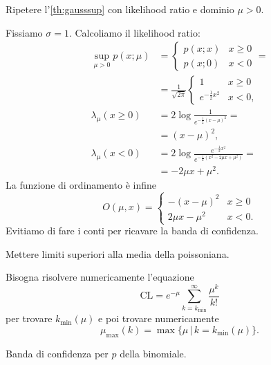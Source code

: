 \begin{exercise}
	Ripetere l'\autoref{th:gausssup} con likelihood ratio e dominio $\mu>0$.
\end{exercise}

\begin{solution*}
	Fissiamo $\sigma=1$.
	Calcoliamo il likelihood ratio:
	\begin{align*}
		\sup\limits_{\mu>0} p(x;\mu)
		&= \begin{cases}
			p(x;x) & x \ge 0 \\
			p(x;0) & x < 0
		\end{cases} = \\
		&= \frac1{\sqrt{2\pi}} \begin{cases}
			1                & x \ge 0 \\
			e^{-\frac12 x^2} & x < 0,
		\end{cases} \\
		\lambda_\mu(x\ge 0)
		&= 2\log \frac 1 {e^{-\frac12(x-\mu)^2}} = \\
		&= (x-\mu)^2, \\
		\lambda_\mu(x<0)
		&= 2\log \frac {e^{-\frac12 x^2}} {e^{-\frac12 (x^2 - 2\mu x + \mu^2)}} = \\
		&= -2\mu x + \mu^2.
	\end{align*}
	La funzione di ordinamento è infine
	\begin{equation*}
		O(\mu,x)
		= \begin{cases}
			- (x-\mu)^2 & x \ge 0 \\
			2\mu x - \mu^2 & x < 0.
		\end{cases}
	\end{equation*}
	Evitiamo di fare i conti per ricavare la banda di confidenza.
\end{solution*}

\begin{exercise}
	Mettere limiti superiori alla media della poissoniana.
\end{exercise}

\begin{solution}
	Bisogna risolvere numericamente l'equazione
	\begin{equation*}
		\mathrm{CL}
		= e^{-\mu} \sum_{k=k_\mathrm{min}}^\infty \frac{\mu^k}{k!}
	\end{equation*}
	per trovare $k_\mathrm{min}(\mu)$ e poi trovare numericamente
	\begin{equation*}
		\mu_\mathrm{max}(k)
		= \max \{\mu \,|\, k=k_\mathrm{min}(\mu)\}.
	\end{equation*}
\end{solution}

\begin{exercise}
	Banda di confidenza per $p$ della binomiale.
\end{exercise}
